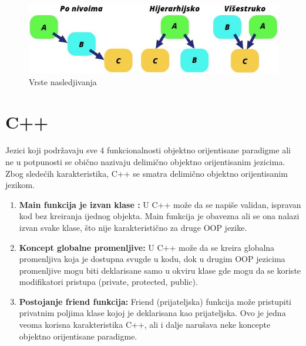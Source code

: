 \documentclass[a4paper]{article}
\begin{document}
{\begin{figure}[h!]
\begin{center}
\includegraphics[scale=0.6]{slike/nasledjivanje.jpg}
\end{center}
\caption{Vrste nasledjivanja}
\label{fig:VrsteNasledjivanja}
\end{figure}

\newpage

\section{C++}
\label{sec:c++}
Jezici koji podržavaju sve 4 funkcionalnosti objektno orijentisane paradigme ali ne u potpunosti se obično nazivaju delimično objektno orijentisanim jezicima. Zbog sledećih karakteristika, C++ se smatra delimično objektno orijentisanim jezikom.
\begin{enumerate}
\item \textbf{Main funkcija je izvan klase :} U C++ može da se napiše validan, ispravan kod bez kreiranja ijednog objekta. Main funkcija je obavezna ali se ona nalazi izvan svake klase, što nije karakteristično za druge OOP jezike.
\item \textbf{Koncept globalne promenljive:} U C++ može da se kreira globalna promenljiva koja je dostupna svugde u kodu, dok u drugim OOP jezicima promenljive mogu biti deklarisane samo u okviru klase gde mogu da se koriste modifikatori pristupa (private, protected, public).
\item \textbf{Postojanje friend funkcija:} Friend (prijateljska) funkcija može pristupiti privatnim poljima klase kojoj je deklarisana kao prijateljska. Ovo je jedna veoma korisna karakteristika C++, ali i dalje narušava neke koncepte objektno orijentisane paradigme.
\end{enumerate}

}
\end{document}
